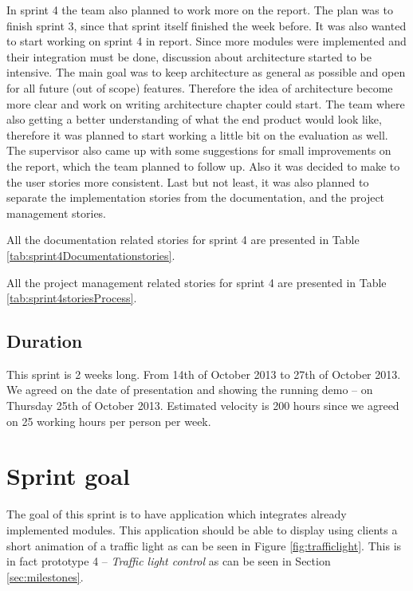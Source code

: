 In sprint 4 the team also planned to work more on the report. 
The plan was to finish sprint 3, since that sprint itself finished the week before. 
It was also wanted to start working on sprint 4 in report.
Since more modules were implemented and their integration must be done, discussion about architecture started to be intensive.
The main goal was to keep architecture as general as possible and open for all future (out of scope) features.
Therefore the idea of architecture become more clear and work on writing architecture chapter could start.
The team where also getting a better understanding of what the end product would look like, therefore it was planned to start working a little bit on the evaluation as well. 
The supervisor also came up with some suggestions for small improvements on the report, which the team planned to follow up.
Also it was decided to make to the user stories more consistent. 
Last but not least, it was also planned to separate the implementation stories from the documentation, and the project management stories.

All the documentation related stories for sprint 4 are presented in Table \ref{tab:sprint4Documentationstories}.


All the project management related stories for sprint 4 are presented in Table \ref{tab:sprint4storiesProcess}.



\subsection{Duration}
This sprint is 2 weeks long. From 14th of October 2013 to 27th of October 2013. 
We agreed on the date of presentation and showing the running demo -- on Thursday 25th of October 2013.
Estimated velocity is 200 hours since we agreed on 25 working hours per person per week.

\section{Sprint goal}
\label{sec:sprint4goal}
The goal of this sprint is to have application which integrates already implemented modules.
This application should be able to display using clients a short animation of a traffic light as can be seen in Figure \ref{fig:trafficlight}.
This is in fact prototype 4 -- \emph{Traffic light control} as can be seen in Section \ref{sec:milestones}.

